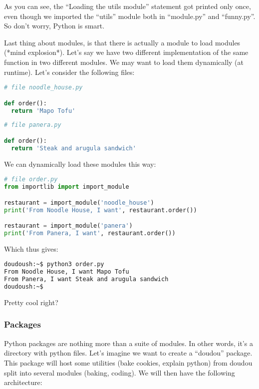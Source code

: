 As you can see, the ``Loading the utils module'' statement got printed only once,
even though we imported the ``utils'' module both in ``module.py'' and ``funny.py''.
So don't worry, Python is smart.

\vspace{5mm}

Last thing about modules, is that there is actually a module to load modules (*mind explosion*).
Let's say we have two different implementation of the same function in two different modules.
We may want to load them dynamically (at runtime). Let's consider the following files:

\begin{lstlisting}[language=python]
# file noodle_house.py

def order():
  return 'Mapo Tofu'
\end{lstlisting}

\begin{lstlisting}[language=python]
# file panera.py

def order():
  return 'Steak and arugula sandwich'
\end{lstlisting}

We can dynamically load these modules this way:

\begin{lstlisting}[language=python]
# file order.py
from importlib import import_module

restaurant = import_module('noodle_house')
print('From Noodle House, I want', restaurant.order())

restaurant = import_module('panera')
print('From Panera, I want', restaurant.order())
\end{lstlisting}

Which thus gives:

\begin{lstlisting}[language=bash]
doudoush:~$ python3 order.py
From Noodle House, I want Mapo Tofu
From Panera, I want Steak and arugula sandwich
doudoush:~$
\end{lstlisting}

Pretty cool right?

\subsubsection{Packages}

Python packages are nothing more than a suite of modules. In other words,
it's a directory with python files. Let's imagine we want to create a ``doudou'' package.
This package will host some utilities (bake cookies, explain python) from doudou split
into several modules (baking, coding). We will then have the following architecture:

